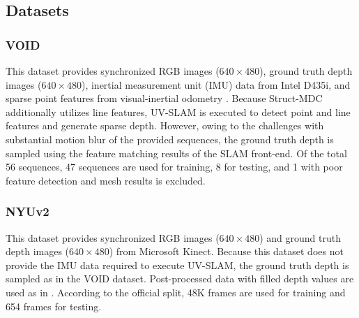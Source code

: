 \subsection{\textcolor{color2}{Datasets}}
\subsubsection{VOID}
This dataset provides synchronized RGB images ($640 \times 480$), ground truth depth images ($640 \times 480$), inertial measurement unit (IMU) data from Intel D435i, and sparse point features from visual-inertial odometry \cite{xivo}. 
\textcolor{color1}{Because} Struct-MDC additionally utilizes line features, UV-SLAM \cite{uvslsam} is executed to detect point and line features \textcolor{color1}{and} generate sparse depth. However, \textcolor{color1}{owing} to the challeng\textcolor{color1}{es} with substantial motion blur of the provided sequences, \textcolor{color1}{the} ground truth depth is sampled using the feature matching results of the SLAM front-end.
Of the total 56 sequences, 47 sequences are used for training, \textcolor{color1}{8 for testing, and 1} with poor feature detection and mesh results is excluded.


\subsubsection{NYUv2}
This dataset provides synchronized RGB images ($640 \times 480$) and ground truth depth images ($640 \times 480$) from Microsoft Kinect. 
\textcolor{color1}{Because} this dataset does not provide the IMU data required to execute UV-SLAM, the ground truth depth is sampled as in the VOID dataset.
Post-processed data with filled depth values \textcolor{color1}{are} used as in \cite{s2d}. According to the official split, 48K frames are used for training \textcolor{color1}{and 654 frames} for testing.



